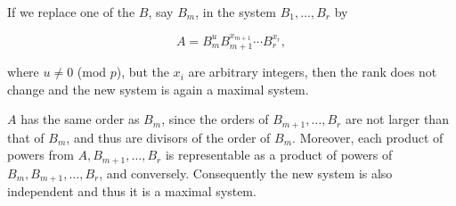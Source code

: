 If we replace one of the $B$, say $B_m$, in the system $B_1, \ldots, B_r$ by

$$A = B_m^u B_{m+1}^{x_{m+1}} \cdots B_r^{x_r},$$

where $u \neq 0$ (mod $p$), but the $x_i$ are arbitrary integers, then the rank does not change and the new system is again a maximal system.

$A$ has the same order as $B_m$, since the orders of $B_{m+1}, \ldots, B_r$ are not larger than that of $B_m$, and thus are divisors of the order of $B_m$. Moreover, each product of powers from $A, B_{m+1}, \ldots, B_r$ is representable as a product of powers of $B_m, B_{m+1}, \ldots, B_r$, and conversely. Consequently the new system is also independent and thus it is a maximal system.
